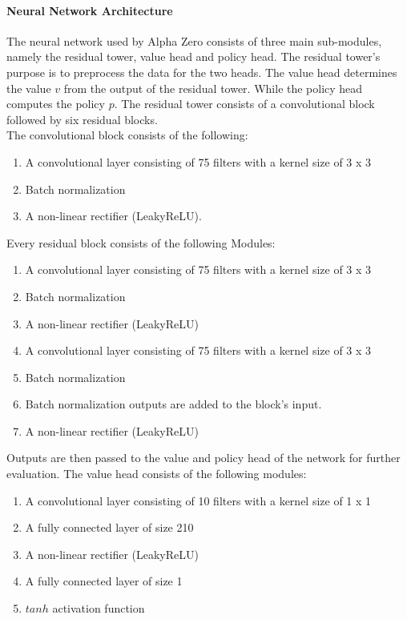 \documentclass[12pt]{article}
\begin{document}
\paragraph{Neural Network Architecture} 
The neural network used by Alpha Zero consists of three main sub-modules, namely the residual tower, value head and policy head. The residual tower's purpose is to preprocess the data for the two heads. The value head determines the value \(v\) from the output of the residual tower. While the policy head computes the policy \(p\). The residual tower consists of a convolutional block followed by six residual blocks.\\
The convolutional block consists of the following: 
\begin{enumerate}
\item A convolutional layer consisting of 75 filters with a kernel size of 3 x 3
\item Batch normalization \cite{ioffe2015batch}
\item A non-linear rectifier (LeakyReLU).
\end{enumerate}
Every residual block consists of the following Modules:
\begin{enumerate}
\item A convolutional layer consisting of 75 filters with a kernel size of 3 x 3
\item Batch normalization \cite{ioffe2015batch}
\item A non-linear rectifier (LeakyReLU)
\item A convolutional layer consisting of 75 filters with a kernel size of 3 x 3
\item Batch normalization \cite{ioffe2015batch}
\item Batch normalization outputs are added to the block's input.
\item A non-linear rectifier (LeakyReLU)
\end{enumerate}
Outputs are then passed to the value and policy head of the network for further evaluation.
The value head consists of the following modules:
\begin{enumerate}
\item A convolutional layer consisting of 10 filters with a kernel size of 1 x 1
\item A fully connected layer of size 210
\item A non-linear rectifier (LeakyReLU)
\item A fully connected layer of size 1
\item \(tanh\) activation function
\end{enumerate}
\end{document}
